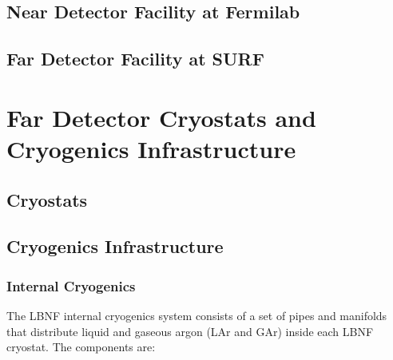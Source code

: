 
\subsection{Near Detector Facility at Fermilab}
\label{sec:exec-summ-lbnf-cf-near}


\subsection{Far Detector Facility at SURF}
\label{sec:exec-summ-lbnf-cf-far}


\section{Far Detector Cryostats and Cryogenics Infrastructure}
\label{sec:exec-summ-lbnf-cryo}

\subsection{Cryostats}
\label{sec:exec-summ-lbnf-cryostats}


\subsection{Cryogenics Infrastructure}
\label{sec:exec-summ-lbnf-cryogen}

\subsubsection{Internal Cryogenics}
\label{sec:exec-summ-lbnf-int-cryogen}

The LBNF internal cryogenics system consists of a set of pipes and manifolds that distribute liquid and gaseous argon (LAr and GAr) inside each LBNF cryostat. The components are: 


